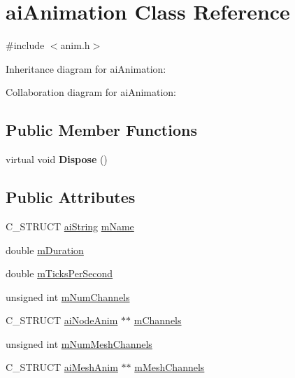 \hypertarget{structai_animation}{\section{ai\+Animation Class Reference}
\label{structai_animation}
}


{\ttfamily \#include $<$anim.\+h$>$}



Inheritance diagram for ai\+Animation\+:


Collaboration diagram for ai\+Animation\+:
\subsection*{Public Member Functions}
\begin{DoxyCompactItemize}
\item 
\hypertarget{structai_animation_a4106cba9370874d9c5105811800d5c1b}{virtual void {\bfseries Dispose} ()}\label{structai_animation_a4106cba9370874d9c5105811800d5c1b}

\end{DoxyCompactItemize}
\subsection*{Public Attributes}
\begin{DoxyCompactItemize}
\item 
C\+\_\+\+S\+T\+R\+U\+C\+T \hyperlink{structai_string}{ai\+String} \hyperlink{structai_animation_a1be7d78d88694173a7ceef658fea77f1}{m\+Name}
\item 
double \hyperlink{structai_animation_ae2bbc49320b4b75c05e23e0ab704ece7}{m\+Duration}
\item 
double \hyperlink{structai_animation_afd26a40c3f16b6aa6e150effa3eaeab1}{m\+Ticks\+Per\+Second}
\item 
unsigned int \hyperlink{structai_animation_aebfccf9a9aefa6084566d21e8a30b7e5}{m\+Num\+Channels}
\item 
C\+\_\+\+S\+T\+R\+U\+C\+T \hyperlink{structai_node_anim}{ai\+Node\+Anim} $\ast$$\ast$ \hyperlink{structai_animation_a89244bb68b725ffbb85137174c28e757}{m\+Channels}
\item 
unsigned int \hyperlink{structai_animation_ac43aacd8502020174e553501f0b6bf5f}{m\+Num\+Mesh\+Channels}
\item 
C\+\_\+\+S\+T\+R\+U\+C\+T \hyperlink{structai_mesh_anim}{ai\+Mesh\+Anim} $\ast$$\ast$ \hyperlink{structai_animation_af05138121dbde8b31aa031505b454c85}{m\+Mesh\+Channels}
\end{DoxyCompactItemize}
